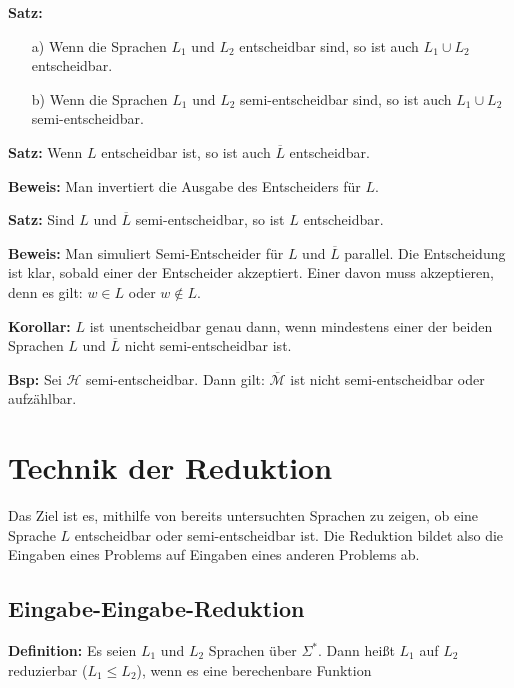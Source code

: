 \documentclass{scrartcl}%
\begin{document}
    \vspace*{0.3cm}
    \textbf{\textsf{Satz:}}
    \begin{itemize}
        \item [a)] Wenn die Sprachen $L_1$ und $L_2$ entscheidbar sind, so ist auch $L_1 \cup L_2$ entscheidbar.
        \item [b)] Wenn die Sprachen $L_1$ und $L_2$ semi-entscheidbar sind, so ist auch $L_1 \cup L_2$ semi-entscheidbar.
    \end{itemize}

    \vspace*{0.3cm}
    \textbf{\textsf{Satz:}} Wenn $L$ entscheidbar ist, so ist auch $\overline{L}$ entscheidbar.

    \vspace*{0.3cm}
    \textbf{\textsf{Beweis:}} Man invertiert die Ausgabe des Entscheiders für $L$.

    \vspace*{0.7cm}
    \textbf{\textsf{Satz:}} Sind $L$ und $\overline{L}$ semi-entscheidbar, so ist $L$ entscheidbar.

    \vspace*{0.3cm}
    \textbf{\textsf{Beweis:}} Man simuliert Semi-Entscheider für $L$ und $\overline{L}$ parallel.
    Die Entscheidung ist klar, sobald einer der Entscheider akzeptiert. Einer davon muss akzeptieren, denn es gilt:
    $w \in L$ oder $ w \notin L$.

    \vspace*{0.7cm}
    \textbf{\textsf{Korollar:}} $L$ ist unentscheidbar genau dann, wenn mindestens einer der beiden Sprachen $L$
    und $\overline{L}$ nicht semi-entscheidbar ist.

    \vspace*{0.3cm}
    \textbf{\textsf{Bsp:}} Sei $\mathcal{H}$ semi-entscheidbar. Dann gilt: $\overline{\mathcal{M}}$ ist nicht semi-entscheidbar oder aufzählbar.

    \section*{Technik der Reduktion}
    Das Ziel ist es, mithilfe von bereits untersuchten Sprachen zu zeigen,
    ob eine Sprache $L$ entscheidbar oder semi-entscheidbar ist.
    Die Reduktion bildet also die Eingaben eines Problems auf Eingaben eines anderen Problems ab.

    \subsection*{Eingabe-Eingabe-Reduktion}
    \textbf{\textsf{Definition:}} Es seien $L_1$ und $L_2$ Sprachen über $\Sigma^*$.
    Dann heißt $L_1$ auf $L_2$ reduzierbar ($L_1 \leq L_2$), wenn es eine berechenbare Funktion
\end{document}

